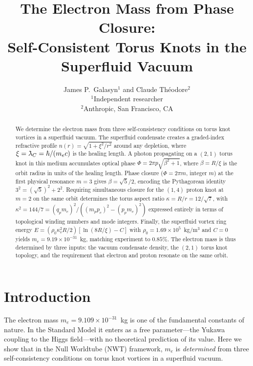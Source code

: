 \documentclass[11pt,a4paper]{article}
\title{\textbf{The Electron Mass from Phase Closure:\\
Self-Consistent Torus Knots in the Superfluid Vacuum}}
\author{
  James P.\ Galasyn$^{1}$ and Claude Th\'eodore$^{2}$ \\[6pt]
  \small $^{1}$Independent researcher \\
  \small $^{2}$Anthropic, San Francisco, CA
}
\date{}
\newcommand{\lambdabar}{\mkern0.75mu\mathchar'26\mkern-9.75mu\lambda}
\begin{document}
\maketitle

\begin{abstract}
We determine the electron mass from three self-consistency conditions
on torus knot vortices in a superfluid vacuum.  The superfluid
condensate creates a graded-index refractive profile
$n(r) = \sqrt{1 + \xi^2/r^2}$ around any depletion, where
$\xi = \lambdabar_C = \hbar/(m_e c)$ is the healing length.  A
photon propagating on a $(2,1)$ torus knot in this medium accumulates
optical phase $\Phi = 2\pi p\sqrt{\beta^2+1}$, where $\beta = R/\xi$
is the orbit radius in units of the healing length.  Phase closure
($\Phi = 2\pi m$, integer $m$) at the first physical resonance
$m = 3$ gives $\beta = \sqrt{5}/2$, encoding the Pythagorean identity
$3^2 = (\sqrt{5})^2 + 2^2$.  Requiring simultaneous closure for the
$(1,4)$ proton knot at $m = 2$ on the same orbit determines the torus
aspect ratio $\kappa = R/r = 12/\sqrt{7}$, with
$\kappa^2 = 144/7 = (q_p m_e)^2/((m_p p_e)^2 - (p_p m_e)^2)$
expressed entirely in terms of topological winding numbers and mode
integers.  Finally, the superfluid vortex ring energy
$E = (\rho_0 \kappa_v^2 R/2)[\ln(8R/\xi) - C]$ with
$\rho_0 = 1.69 \times 10^5$~kg/m$^3$ and $C = 0$ yields
$m_e = 9.19 \times 10^{-31}$~kg, matching experiment to $0.85\%$.
The electron mass is thus determined by three inputs: the vacuum
condensate density, the $(2,1)$ torus knot topology, and the
requirement that electron and proton resonate on the same orbit.
\end{abstract}

\tableofcontents


\section{Introduction}
\label{sec:intro}

The electron mass $m_e = 9.109 \times 10^{-31}$~kg is one of the
fundamental constants of nature.  In the Standard Model it enters as
a free parameter---the Yukawa coupling to the Higgs field---with no
theoretical prediction of its value.  Here we show that in the Null
Worldtube (NWT) framework, $m_e$ is \emph{determined} from three
self-consistency conditions on torus knot vortices in a superfluid
vacuum.
\end{document}
